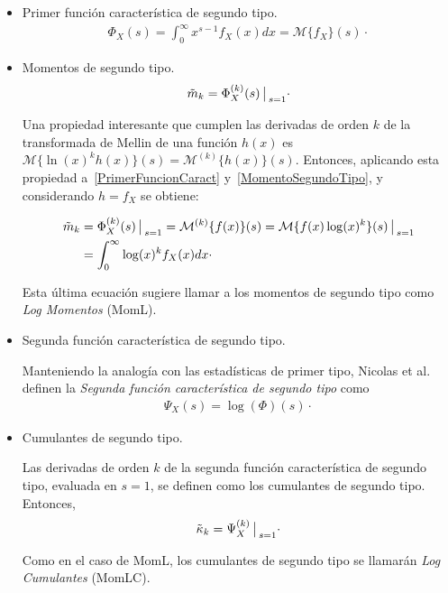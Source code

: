 \begin{itemize}
\item Primer función característica de segundo tipo.
	\begin{align}
	\Phi_X(s)=\int_{0}^{\infty} x^{s-1} f_X(x) dx = \mathcal{M}\{f_X\}(s)\cdot
	\label{PrimerFuncionCaract}
	\end{align}
\item Momentos de segundo tipo.
	\begin{align}
	\label{MomentoSegundoTipo}
	\tilde{m}_k=\Phi_X^{(k)}(s) \big\arrowvert _{s=1}\cdot
	\end{align}


	Una propiedad interesante que cumplen las derivadas de orden $k$ de la transformada de Mellin de una función $h(x)$ es $\mathcal{M}\{\ln(x)^k h(x)\}(s)=\mathcal{M}^{(k)}\{h(x)\}(s)$. Entonces, aplicando esta propiedad a~\eqref{PrimerFuncionCaract} y~\eqref{MomentoSegundoTipo}, y considerando $h=f_X$ se obtiene:

	\begin{align}
	\label{MomL}
	\nonumber \tilde{m}_k&=\Phi_X^{(k)}(s) \big\arrowvert _{s=1} =\mathcal{M}^{(k)}\{f(x)\}(s) =\mathcal{M}\{f(x) \log(x)^k\}(s)\big\arrowvert _{s=1}          \\
 	        &=\int_{0}^{\infty} \log(x)^k f_X(x) dx \cdot
	\end{align}

	Esta última ecuación sugiere llamar a los momentos de segundo tipo como \textit{Log Momentos} (MomL).
	
\item Segunda función característica de segundo tipo.

      Manteniendo la analogía con las estadísticas de primer tipo, Nicolas et al.~\cite{nicolas2002} definen la \textit{Segunda función característica de segundo tipo} como
      \begin{align}
      \label{Sgunda Psi}
      \Psi_X(s)=\log(\Phi)(s)\cdot
      \end{align}
      
\item Cumulantes de segundo tipo.

	  Las derivadas de orden $k$ de la segunda función característica de segundo tipo, evaluada en $s=1$, se definen como los cumulantes de segundo tipo. Entonces,
	  \begin{align}
	  \label{CumulanteSegundoTipo}
	  \tilde{\kappa}_k=\Psi_X^{(k)}\big\arrowvert _{s=1}\cdot
	  \end{align}
	  
Como en el caso de MomL, los cumulantes de segundo tipo se llamarán \textit{Log Cumulantes} (MomLC).
\end{itemize}

